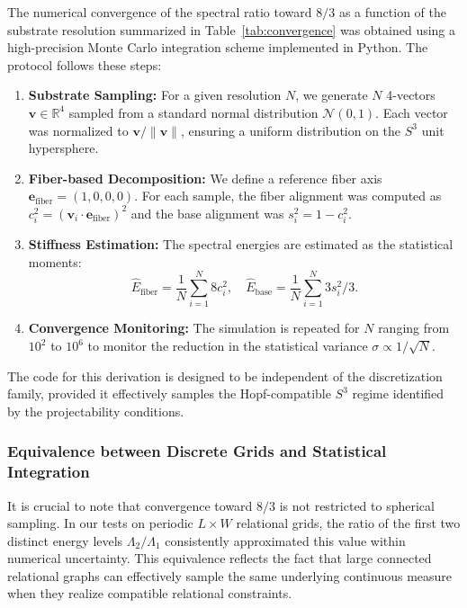     The numerical convergence of the spectral ratio toward $8/3$ as a function of the substrate resolution summarized in
    Table~\ref{tab:convergence}
        was obtained using a high-precision Monte Carlo integration scheme implemented in Python.
        The protocol follows these steps:
    \begin{enumerate}
      \item \textbf{Substrate Sampling:} For a given resolution $N$, we generate $N$ 4-vectors
      $\mathbf{v} \in \mathbb{R}^4$ sampled from a standard normal distribution $\mathcal{N}(0,1)$.
      Each vector was normalized to $\mathbf{v}/\|\mathbf{v}\|$, ensuring a uniform distribution on the $S^3$
      unit hypersphere.
      \item \textbf{Fiber-based Decomposition:} We define a reference fiber axis
      $\mathbf{e}_{\text{fiber}} = (1, 0, 0, 0)$.
      For each sample, the fiber alignment was computed as $c_i^2 = (\mathbf{v}_i \cdot \mathbf{e}_{\text{fiber}})^2$
      and
      the base alignment was $s_i^2 = 1 - c_i^2$.
      \item \textbf{Stiffness Estimation:} The spectral energies are estimated as the statistical moments:
      \begin{equation}
        \hat{E}_{\text{fiber}} = \frac{1}{N} \sum_{i=1}^N 8 c_i^2, \quad
        \hat{E}_{\text{base}} = \frac{1}{N} \sum_{i=1}^N 3 s_i^2 / 3.
      \end{equation}
      \item \textbf{Convergence Monitoring:} The simulation is repeated for $N$ ranging from $10^2$ to $10^6$
      to monitor the reduction in the statistical variance $\sigma \propto 1/\sqrt{N}$.
    \end{enumerate}
    The code for this derivation is designed to be independent of the discretization family, provided it effectively
    samples the Hopf-compatible $S^3$ regime identified by the projectability conditions.

  \subsubsection*{Equivalence between Discrete Grids and Statistical Integration}
    \label{subsec:equivalence_grid_mc}

    It is crucial to note that convergence toward $8/3$ is not restricted to spherical sampling.
    In our tests on periodic $L \times W$ relational grids, the ratio of the first two distinct energy levels
    $\Lambda_2/\Lambda_1$ consistently approximated this value within numerical uncertainty.
    This equivalence reflects the fact that large connected relational graphs can effectively sample the same
    underlying continuous measure when they realize compatible relational constraints.

